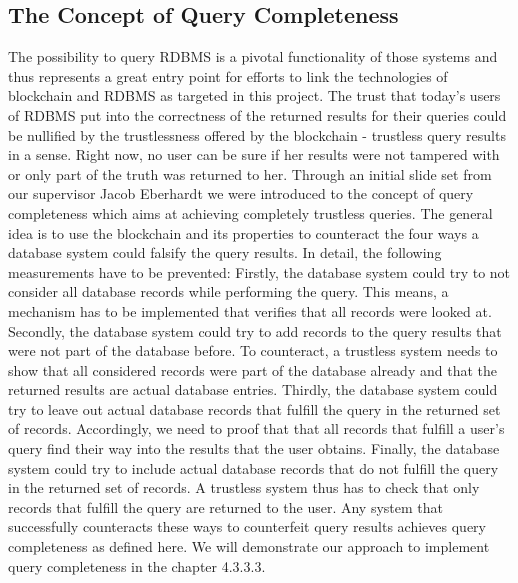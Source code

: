 \subsection{The Concept of Query Completeness}
The possibility to query RDBMS is a pivotal functionality of those systems and thus represents a great entry point for efforts to link the technologies of blockchain and RDBMS as targeted in this project. The trust that today’s users of RDBMS put into the correctness of the returned results for their queries could be nullified by the trustlessness offered by the blockchain - trustless query results in a sense. Right now, no user can be sure if her results were not tampered with or only part of the truth was returned to her.
Through an initial slide set from our supervisor Jacob Eberhardt we were introduced to the concept of query completeness which aims at achieving completely trustless queries. The general idea is to use the blockchain and its properties to counteract the four ways a database system could falsify the query results. In detail, the following measurements have to be prevented:
Firstly, the database system could try to not consider all database records while performing the query. This means, a mechanism has to be implemented that verifies that all records were looked at.
Secondly, the database system could try to add records to the query results that were not part of the database before. To counteract, a trustless system needs to show that all considered records were part of the database already and that the returned results are actual database entries.
Thirdly, the database system could try to leave out actual database records that fulfill the query in the returned set of records. Accordingly, we need to proof that that all records that fulfill a user’s query find their way into the results that the user obtains.
Finally, the database system could try to include actual database records that do not fulfill the query in the returned set of records. A trustless system thus has to check that only records that fulfill the query are returned to the user.
Any system that successfully counteracts these ways to counterfeit query results achieves query completeness as defined here. We will demonstrate our approach to implement query completeness in the chapter 4.3.3.3.
